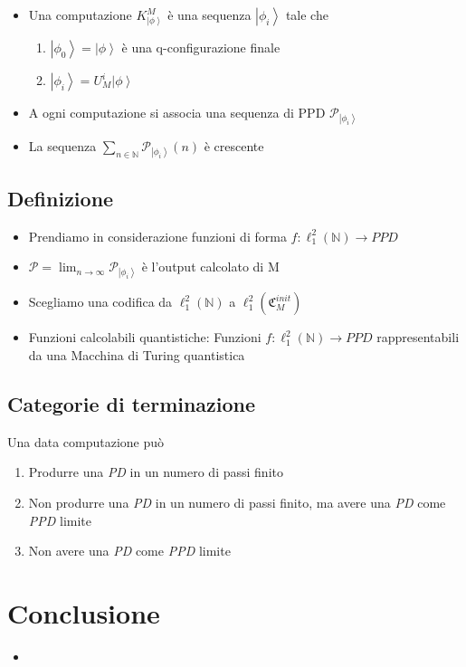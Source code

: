 \documentclass{beamer}
\newcommand{\ket}[1]{\left | #1 \right \rangle}
\newcommand{\conf}{\mathfrak{C}_{M}}
\newcommand{\hil}{\ell^{2}}
\newcommand{\hiluninorm}{\hil_{1}}
\begin{document}
\begin{frame}{\secname}{\subsecname}
	\begin{itemize}
		\item Una \alert{computazione} \(K^{M}_{\ket{\phi}}\) è una sequenza \(\ket{\phi_{i}}\) tale che
		\begin{enumerate}
			\item \(\ket{\phi_{0}} = \ket{\phi}\) è una q-configurazione finale
			\item \(\ket{\phi_{i}} = U_{M}^{i}\ket{\phi}\)
		\end{enumerate}
		\item A ogni computazione si associa una sequenza di PPD \( \mathcal{P}_{\ket{\phi_{i}}} \)
		\item La sequenza \(\sum_{n \in \mathbb{N}} \mathcal{P}_{\ket{\phi_{i}}} \left ( n \right )\) è crescente
	\end{itemize}
\end{frame}

\subsection{Definizione}

\begin{frame}{\secname}{\subsecname}
	\begin{itemize}
		\item Prendiamo in considerazione funzioni di forma \( f : \hiluninorm \left ( \mathbb{N} \right ) \rightarrow PPD \)
		\item \( \mathcal{P} = \lim_{n \to \infty} \mathcal{P}_{\ket{\phi_{i}}} \) è l'\alert{output calcolato} di M
		\item Scegliamo una codifica da \( \hiluninorm \left ( \mathbb{N} \right ) \) a \( \hiluninorm \left ( \conf^{init} \right ) \)
		\item \alert{Funzioni calcolabili quantistiche}: Funzioni \( f : \hiluninorm \left ( \mathbb{N} \right ) \rightarrow PPD \) rappresentabili da una Macchina di Turing quantistica
	\end{itemize}
\end{frame}

\subsection{Categorie di terminazione}

\begin{frame}{\subsecname}{}
	Una data computazione può
	\begin{enumerate}
		\item Produrre una \textit{PD} in un numero di passi finito
		\item Non produrre una \textit{PD} in un numero di passi finito, ma avere una \textit{PD} come \textit{PPD} limite
		\item Non avere una \textit{PD} come \textit{PPD} limite
	\end{enumerate}
\end{frame}

\section{Conclusione}

\begin{frame}{\secname}{}
	\begin{itemize}
		\item
	\end{itemize}
\end{frame}
\end{document}
